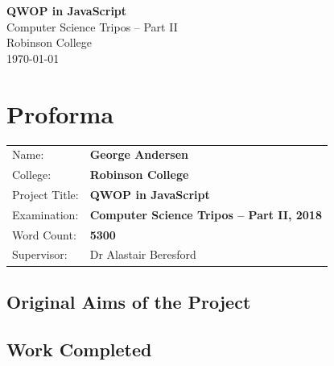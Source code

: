 \documentclass[12pt,a4paper,twoside,openright]{report}
\begin{document}


\pagestyle{empty}


\vspace*{60mm}
\begin{center}
\Huge
\textbf{QWOP in JavaScript} \\[5mm]
Computer Science Tripos -- Part II \\[5mm]
Robinson College \\[5mm]
\today  %
\end{center}

\vspace{5mm}



\pagestyle{plain}

\chapter*{Proforma}

{\large
\begin{tabular}{ll}
Name:               & \bf George Andersen                       \\
College:            & \bf Robinson College                     \\
Project Title:      & \bf QWOP in JavaScript \\
Examination:        & \bf Computer Science Tripos -- Part II, 2018  \\
Word Count:         & \bf 5300\footnotemark[1]                \\
Supervisor:         & Dr Alastair Beresford                    \\ 
\end{tabular}
}



\section*{Original Aims of the Project}





\section*{Work Completed}
\end{document}

